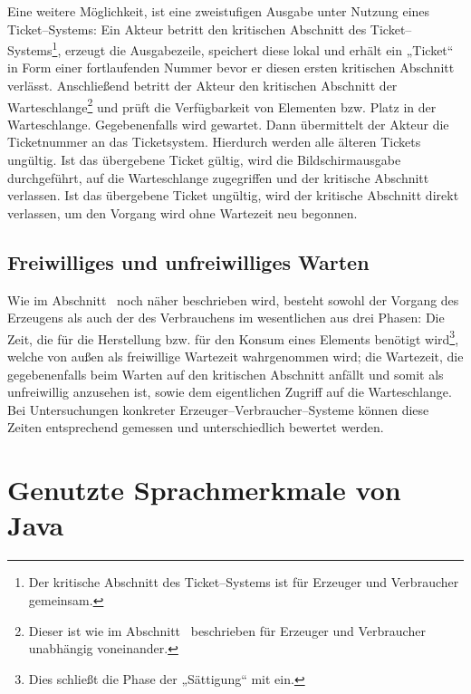 Eine weitere Möglichkeit, ist eine zweistufigen Ausgabe unter Nutzung eines Ticket--Systems: Ein Akteur betritt den kritischen Abschnitt des Ticket–Systems\footnote{Der kritische Abschnitt des Ticket–Systems ist für Erzeuger und Verbraucher gemeinsam.}, erzeugt die Ausgabezeile, speichert diese lokal und erhält ein „Ticket“ in Form einer fortlaufenden Nummer bevor er diesen ersten kritischen Abschnitt verlässt. Anschließend betritt der Akteur den kritischen Abschnitt der Warteschlange\footnote{Dieser ist wie im Abschnitt~ beschrieben für Erzeuger und Verbraucher unabhängig voneinander.} und prüft die Verfügbarkeit von Elementen bzw. Platz in der Warteschlange. Gegebenenfalls wird gewartet. Dann übermittelt der Akteur die Ticketnummer an das Ticketsystem. Hierdurch werden alle älteren Tickets ungültig. Ist das übergebene Ticket gültig, wird die Bildschirmausgabe durchgeführt, auf die Warteschlange zugegriffen und der kritische Abschnitt verlassen. Ist das übergebene Ticket ungültig, wird der kritische Abschnitt direkt verlassen, um den Vorgang wird ohne Wartezeit neu begonnen. 

\subsection{Freiwilliges und unfreiwilliges Warten} %
\label{sub:freiwilliges_und_unfreiwilliges_warten}

Wie im Abschnitt~ noch näher beschrieben wird, besteht sowohl der Vorgang des Erzeugens als auch der des Verbrauchens im wesentlichen aus drei Phasen: Die Zeit, die für die Herstellung bzw. für den Konsum eines Elements benötigt wird\footnote{Dies schließt die Phase der „Sättigung“ mit ein.}, welche von außen als freiwillige Wartezeit wahrgenommen wird; die Wartezeit, die gegebenenfalls beim Warten auf den kritischen Abschnitt anfällt und somit als unfreiwillig anzusehen ist, sowie dem eigentlichen Zugriff auf die Warteschlange. Bei Untersuchungen konkreter Erzeuger–Verbraucher–Systeme können diese Zeiten entsprechend gemessen und unterschiedlich bewertet werden.



\section{Genutzte Sprachmerkmale von Java} %
\label{sec:genutzte_sprachmerkmale_von_java}

